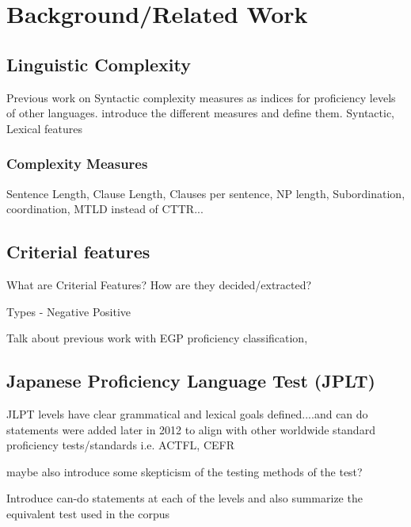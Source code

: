 \chapter{Background/Related Work}
\section{Linguistic Complexity}
Previous work on Syntactic complexity measures as indices for proficiency levels of other languages.
introduce the different measures and define them.
Syntactic, Lexical features

\subsection{Complexity Measures}
Sentence Length, Clause Length, Clauses per sentence, NP length, Subordination, coordination, MTLD instead of CTTR...


\section{Criterial features}
What are Criterial Features? How are they decided/extracted?

Types - Negative Positive

Talk about previous work with EGP proficiency classification,

\section{Japanese Proficiency Language Test (JPLT)}
JLPT levels have clear grammatical and lexical goals defined....and can do statements were added later in 2012 to align with other worldwide standard proficiency tests/standards i.e. ACTFL, CEFR

maybe also introduce some skepticism of the testing methods of the test?

Introduce can-do statements at each of the levels and also summarize the equivalent test used in the corpus